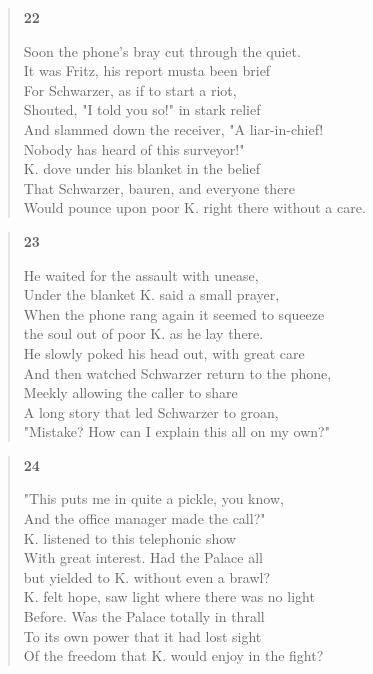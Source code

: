 \documentclass{article}
\begin{document}
\begin{verse}
  \begin{center}
    \textbf{22} \\
  \end{center}
  Soon the phone's bray cut through the quiet. \\
  It was Fritz, his report musta been brief \\
  For Schwarzer, as if to start a riot, \\
  Shouted, "I told you so!" in stark relief \\
  And slammed down the receiver, "A liar-in-chief! \\
  Nobody has heard of this surveyor!" \\
  K. dove under his blanket in the belief \\
  That Schwarzer, bauren, and everyone there \\
  Would pounce upon poor K. right there without a care.
\end{verse}

\begin{verse}
  \begin{center}
    \textbf{23} \\
  \end{center}
  He waited for the assault with unease, \\
  Under the blanket K. said a small prayer, \\
  When the phone rang again it seemed to squeeze \\
  the soul out of poor K. as he lay there. \\
  He slowly poked his head out, with great care \\
  And then watched Schwarzer return to the phone, \\
  Meekly allowing the caller to share \\
  A long story that led Schwarzer to groan, \\
  "Mistake? How can I explain this all on my own?"
\end{verse}

\newpage

\begin{verse}
  \begin{center}
    \textbf{24} \\
  \end{center}
"This puts me in quite a pickle, you know, \\
And the office manager made the call?" \\
K. listened to this telephonic show \\
With great interest. Had the Palace all \\
but yielded to K. without even a brawl? \\
K. felt hope, saw light where there was no light \\
Before. Was the Palace totally in thrall \\
To its own power that it had lost sight \\
Of the freedom that K. would enjoy in the fight?
\end{verse}
\end{document}
